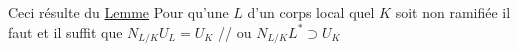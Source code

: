 
Ceci résulte du \uline{Lemme} Pour qu'une  $L$ d'un corps local  quel $K$ soit non ramifiée il faut et il suffit que $N_{L/K}U_L=U_K$ // ou $N_{L/K}L^*\supset U_K$


